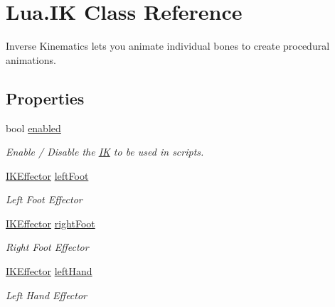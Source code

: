 \hypertarget{class_lua_1_1_i_k}{}\section{Lua.\+IK Class Reference}
\label{class_lua_1_1_i_k}


Inverse Kinematics lets you animate individual bones to create procedural animations.  


\subsection*{Properties}
\begin{DoxyCompactItemize}
\item 
bool \mbox{\hyperlink{class_lua_1_1_i_k_a9cbf5715c753f97860bf9d268e76abcc}{enabled}}
\begin{DoxyCompactList}\small\item\em Enable / Disable the \mbox{\hyperlink{class_lua_1_1_i_k}{IK}} to be used in scripts. \end{DoxyCompactList}\item 
\mbox{\hyperlink{class_lua_1_1_i_k_effector}{I\+K\+Effector}} \mbox{\hyperlink{class_lua_1_1_i_k_a8cea34c6258871a550fc9d56f8facea1}{left\+Foot}}
\begin{DoxyCompactList}\small\item\em Left Foot Effector \end{DoxyCompactList}\item 
\mbox{\hyperlink{class_lua_1_1_i_k_effector}{I\+K\+Effector}} \mbox{\hyperlink{class_lua_1_1_i_k_a0868dad53aa0ea22b3554edc766ee8bc}{right\+Foot}}
\begin{DoxyCompactList}\small\item\em Right Foot Effector \end{DoxyCompactList}\item 
\mbox{\hyperlink{class_lua_1_1_i_k_effector}{I\+K\+Effector}} \mbox{\hyperlink{class_lua_1_1_i_k_a88ba05bd1557a61e1f69e21fd172641c}{left\+Hand}}
\begin{DoxyCompactList}\small\item\em Left Hand Effector \end{DoxyCompactList}\item 

\end{DoxyCompactItemize}

